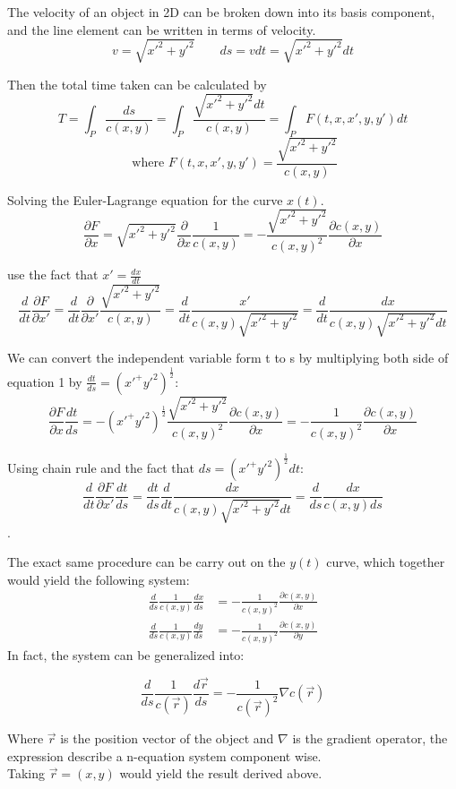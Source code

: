 \documentclass[%
 amsmath,amssymb,
aps,
 fleqn,
 notitlepage,
]{revtex4-2}
\begin{document}
The velocity of an object in 2D can be broken down into its basis component, and the line element can be written in terms of velocity.
\[v = \sqrt{x'^2+y'^2}\qquad ds = vdt = \sqrt{x'^2+y'^2}dt\]

Then the total time taken can be calculated by
\[T = \int_P \frac{ds}{c(x,y)} = \int_P \frac{\sqrt{x'^2+y'^2}dt}{c(x,y)} = \int_PF(t,x,x',y,y')dt\]
\[\text{ where }F(t,x,x',y,y') = \frac{\sqrt{x'^2+y'^2}}{c(x,y)}\]

Solving the Euler-Lagrange equation for the curve $x(t)$.
\[\frac{\partial F}{\partial x} = \sqrt{x'^2+y'^2}\frac{\partial}{\partial x}\frac{1}{c(x,y)} = -\frac{\sqrt{x'^2+y'^2}}{c(x,y)^2}\frac{\partial c(x,y)}{\partial x}\]

use the fact that $x' = \frac{dx}{dt}$
\[\frac{d}{d t} \frac{\partial F}{\partial x'} = \frac{d}{dt} \frac{\partial}{\partial x'}\frac{\sqrt{x'^2+y'^2}}{c(x,y)} = \frac{d}{dt} \frac{x'}{c(x,y)\sqrt{x'^2+y'^2}} = \frac{d}{dt} \frac{dx}{c(x,y)\sqrt{x'^2+y'^2}dt}\]

We can convert the independent variable form t to s by multiplying both side of equation 1 by $\frac{dt}{ds} = (x'^+y'^2)^{\frac{1}{2}}$:
\[\frac{\partial F}{\partial x}\frac{dt}{ds} = -(x'^+y'^2)^{\frac{1}{2}}\frac{\sqrt{x'^2+y'^2}}{c(x,y)^2}\frac{\partial c(x,y)}{\partial x} = -\frac{1}{c(x,y)^2}\frac{\partial c(x,y)}{\partial x}\]

Using chain rule and the fact that $ds = (x'^+y'^2)^{\frac{1}{2}} dt$:
\[\frac{d}{d t} \frac{\partial F}{\partial x'} \frac{dt}{ds} = \frac{dt}{ds}\frac{d}{dt} \frac{dx}{c(x,y)\sqrt{x'^2+y'^2}dt} = \frac{d}{ds}\frac{dx}{c(x,y)ds}\].

The exact same procedure can be carry out on the $y(t)$ curve, which together would yield the following system:
\begin{align*}
\frac{d}{ds}\frac{1}{c(x,y)}\frac{dx}{ds} &= -\frac{1}{c(x,y)^2}\frac{\partial c(x,y)}{\partial x}\\
\frac{d}{ds}\frac{1}{c(x,y)}\frac{dy}{ds} &= -\frac{1}{c(x,y)^2}\frac{\partial c(x,y)}{\partial y}
\end{align*}
In fact, the system can be generalized into:

\[\frac{d}{ds} \frac{1}{c(\vec{r})}\frac{d\vec{r}}{ds} = -\frac{1}{c(\vec{r})^2}\nabla c(\vec{r})\]

Where $\vec{r}$ is the position vector of the object and $\nabla$ is the gradient operator, the expression describe a n-equation system component wise.\\
Taking $\vec{r} = (x,y)$ would yield the result derived above.\\
\end{document}
